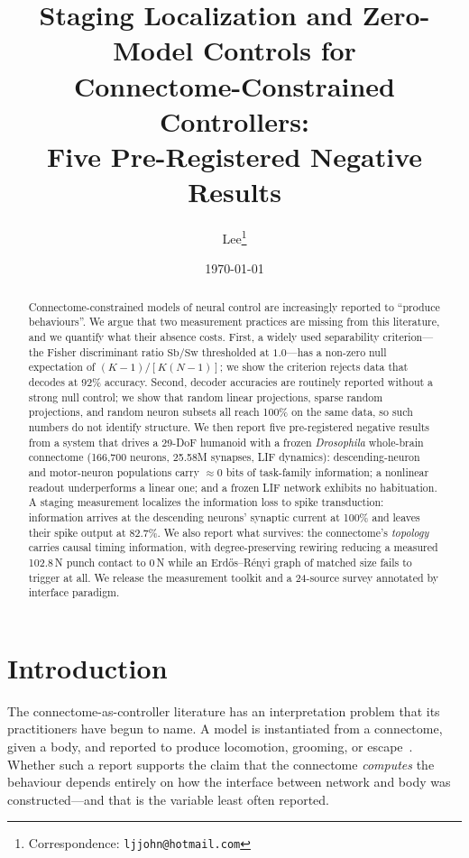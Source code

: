 \documentclass[11pt]{article}
\title{\bfseries Staging Localization and Zero-Model Controls for\\
Connectome-Constrained Controllers:\\
Five Pre-Registered Negative Results}
\author[1]{Lee\thanks{Correspondence: \texttt{ljjohn@hotmail.com}}}
\affil[1]{Independent researcher}
\date{\today}
\begin{document}
\maketitle

\begin{abstract}
Connectome-constrained models of neural control are increasingly reported to
``produce behaviours''. We argue that two measurement practices are missing from
this literature, and we quantify what their absence costs. First, a widely used
separability criterion---the Fisher discriminant ratio $\mathrm{Sb}/\mathrm{Sw}$
thresholded at $1.0$---has a non-zero null expectation of $(K{-}1)/[K(N{-}1)]$;
we show the criterion rejects data that decodes at 92\% accuracy. Second, decoder
accuracies are routinely reported without a strong null control; we show that
random linear projections, sparse random projections, and random neuron subsets
all reach 100\% on the same data, so such numbers do not identify structure.
We then report five pre-registered negative results from a system that drives a
29-DoF humanoid with a frozen \emph{Drosophila} whole-brain connectome
(166{,}700 neurons, 25.58M synapses, LIF dynamics): descending-neuron and
motor-neuron populations carry $\approx 0$ bits of task-family information; a
nonlinear readout underperforms a linear one; and a frozen LIF network exhibits
no habituation. A staging measurement localizes the information loss to spike
transduction: information arrives at the descending neurons' synaptic current at
100\% and leaves their spike output at 82.7\%. We also report what survives: the
connectome's \emph{topology} carries causal timing information, with
degree-preserving rewiring reducing a measured 102.8\,N punch contact to 0\,N
while an Erd\H{o}s--R\'enyi graph of matched size fails to trigger at all.
We release the measurement toolkit and a 24-source survey annotated by interface
paradigm.
\end{abstract}

\section{Introduction}

The connectome-as-controller literature has an interpretation problem that its
practitioners have begun to name. A model is instantiated from a connectome,
given a body, and reported to produce locomotion, grooming, or
escape~\cite{flygm,neuromechfly}. Whether
such a report supports the claim that the connectome \emph{computes} the
behaviour depends entirely on how the interface between network and body was
constructed---and that is the variable least often reported.
\end{document}
